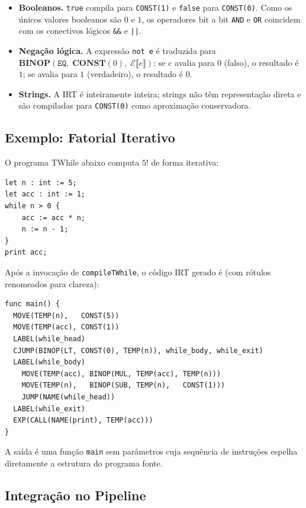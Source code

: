 \begin{itemize}
  \item \textbf{Booleanos.}  \texttt{true} compila para \texttt{CONST(1)} e
    \texttt{false} para \texttt{CONST(0)}.  Como os únicos valores booleanos
    são $0$ e $1$, os operadores bit a bit \texttt{AND} e \texttt{OR}
    coincidem com os conectivos lógicos \texttt{\&\&} e \texttt{||}.
  \item \textbf{Negação lógica.}  A expressão \texttt{not~e} é traduzida para
    $\mathbf{BINOP}(\mathtt{EQ},\; \mathbf{CONST}(0),\;
    \mathcal{E}\llbracket e \rrbracket)$:
    se $e$ avalia para $0$ (falso), o resultado é $1$; se avalia para $1$
    (verdadeiro), o resultado é $0$.
  \item \textbf{Strings.}  A IRT é inteiramente inteira; strings não têm
    representação direta e são compiladas para \texttt{CONST(0)} como
    aproximação conservadora.
\end{itemize}

\subsection{Exemplo: Fatorial Iterativo}\label{sec:ir-impl-example}

O programa TWhile abaixo computa $5!$ de forma iterativa:

\begin{verbatim}
let n : int := 5;
let acc : int := 1;
while n > 0 {
    acc := acc * n;
    n := n - 1;
}
print acc;
\end{verbatim}

Após a invocação de \texttt{compileTWhile}, o código IRT gerado é (com rótulos
renomeados para clareza):

\begin{verbatim}
func main() {
  MOVE(TEMP(n),   CONST(5))
  MOVE(TEMP(acc), CONST(1))
  LABEL(while_head)
  CJUMP(BINOP(LT, CONST(0), TEMP(n)), while_body, while_exit)
  LABEL(while_body)
    MOVE(TEMP(acc), BINOP(MUL, TEMP(acc), TEMP(n)))
    MOVE(TEMP(n),   BINOP(SUB, TEMP(n),   CONST(1)))
    JUMP(NAME(while_head))
  LABEL(while_exit)
  EXP(CALL(NAME(print), TEMP(acc)))
}
\end{verbatim}

A saída é uma função \texttt{main} sem parâmetros cuja sequência de
instruções espelha diretamente a estrutura do programa fonte.

\subsection{Integração no Pipeline}\label{sec:ir-impl-pipeline}


